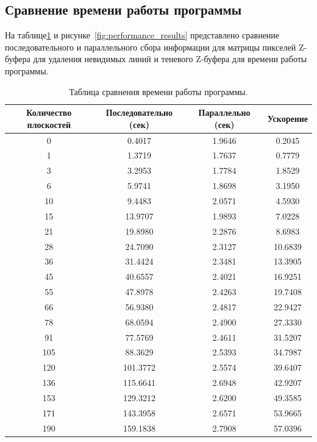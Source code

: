 \subsection{Сравнение времени работы программы}

\hspace{1.25cm}
На таблице\ref{tab:performance_results} и рисунке~\ref{fig:performance_results} представлено сравнение последовательного и параллельного сбора информации для матрицы пикселей Z-буфера для удаления невидимых линий и теневого Z-буфера для времени работы программы.

\begin{table}[ht]
\centering
\caption{Таблица сравнения времени работы программы.}
\begin{tabular}{|c|c|c|c|}
\hline
\textbf{Количество плоскостей} & \textbf{Последовательно (сек)} & \textbf{Параллельно (сек)} & \textbf{Ускорение} \\ \hline
0   & 0.4017  & 1.9646  & 0.2045  \\ \hline
1   & 1.3719  & 1.7637  & 0.7779  \\ \hline
3   & 3.2953  & 1.7784  & 1.8529  \\ \hline
6   & 5.9741  & 1.8698  & 3.1950  \\ \hline
10  & 9.4483  & 2.0571  & 4.5930  \\ \hline
15  & 13.9707 & 1.9893  & 7.0228  \\ \hline
21  & 19.8980 & 2.2876  & 8.6983  \\ \hline
28  & 24.7090 & 2.3127  & 10.6839 \\ \hline
36  & 31.4424 & 2.3481  & 13.3905 \\ \hline
45  & 40.6557 & 2.4021  & 16.9251 \\ \hline
55  & 47.8978 & 2.4263  & 19.7408 \\ \hline
66  & 56.9380 & 2.4817  & 22.9427 \\ \hline
78  & 68.0594 & 2.4900  & 27.3330 \\ \hline
91  & 77.5769 & 2.4611  & 31.5207 \\ \hline
105 & 88.3629 & 2.5393  & 34.7987 \\ \hline
120 & 101.3772 & 2.5574 & 39.6407 \\ \hline
136 & 115.6641 & 2.6948 & 42.9207 \\ \hline
153 & 129.3212 & 2.6200 & 49.3585 \\ \hline
171 & 143.3958 & 2.6571 & 53.9665 \\ \hline
190 & 159.1838 & 2.7908 & 57.0396 \\ \hline
\end{tabular}
\label{tab:performance_results}
\end{table}

